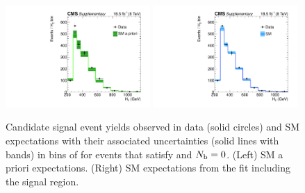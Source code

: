 \begin{figure}[h!]
  \begin{center}
    \includegraphics[width=0.49\textwidth,page=2]{figures/fit_result/bestFit_2012dev_RQcdZero_fZinvAll_0b_ge4j-12p_smOnly} 
    \includegraphics[width=0.49\textwidth,page=2]{figures/fit_result/bestFit_2012dev_RQcdZero_fZinvAll_0b_ge4j-12hp_smOnly} \\
    \caption{\label{fig:best-fit-0b} Candidate signal event yields
      observed in data (solid circles) and SM expectations with their
      associated uncertainties (solid lines with bands) in bins of
      \scalht for events that satisfy \njethigh and $N_{\text{b}} = 0$. (Left)
      SM a priori expectations. (Right) SM expectations from the fit
      including the signal region. }
  \end{center}
\end{figure}

